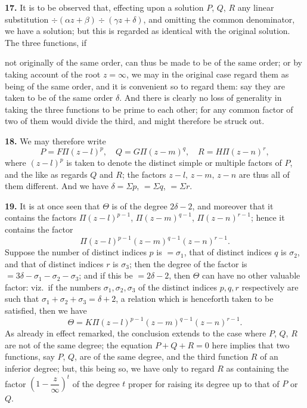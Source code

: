 \documentclass[11pt]{article}
\newcommand{\artno}[1]{\textbf{#1.}\quad}
\begin{document}
\artno{17} It is to be observed that, effecting upon a solution $P$, $Q$, $R$ any linear substitution
$\div (\alpha z + \beta) \div (\gamma z + \delta)$, and omitting the common denominator, we have a solution;
but this is regarded as identical with the original solution. The three functions, if

\newpage
not originally of the same order, can thus be made to be of the same order; or by
taking account of the root $z = \infty$, we may in the original case regard them as being
of the same order, and it is convenient so to regard them: say they are taken to
be of the same order $\delta$. And there is clearly no loss of generality in taking the
three functions to be prime to each other; for any common factor of two of them
would divide the third, and might therefore be struck out.

\artno{18} We may therefore write
\[
   P = F\Pi(z-l)^{p}, \quad Q = G\Pi(z-m)^{q}, \quad R = H\Pi(z-n)^{r},
\]
where $(z-l)^{p}$ is taken to denote the distinct simple or multiple factors of $P$, and
the like as regards $Q$ and $R$; the factors $z-l,\,z-m,\,z-n$ are thus all of them different.
And we have $\delta = \Sigma p$, $= \Sigma q$, $= \Sigma r$.

\artno{19} It is at once seen that $\Theta$ is of the degree $2\delta - 2$, and moreover that it
contains the factors $\Pi(z-l)^{p-1}$, $\Pi(z-m)^{q-1}$, $\Pi(z-n)^{r-1}$; hence it contains the factor
\[
   \Pi(z-l)^{p-1}(z-m)^{q-1}(z-n)^{r-1}.
\]
Suppose the number of distinct indices $p$ is $=\sigma_{1}$, that of distinct indices $q$ is $\sigma_{2}$, and
that of distinct indices $r$ is $\sigma_{3}$; then the degree of the factor is $=3\delta - \sigma_{1} - \sigma_{2} - \sigma_{3}$;
and if this be $=2\delta - 2$, then $\Theta$ can have no other valuable factor: viz.\ if the numbers
$\sigma_{1}, \sigma_{2}, \sigma_{3}$ of the distinct indices $p, q, r$ respectively are such that $\sigma_{1} + \sigma_{2} + \sigma_{3} = \delta + 2$,
a relation which is henceforth taken to be satisfied, then we have
\[
   \Theta = K\Pi(z-l)^{p-1}(z-m)^{q-1}(z-n)^{r-1}.
\]
As already in effect remarked, the conclusion extends to the case where $P$, $Q$, $R$ are
not of the same degree; the equation $P + Q + R = 0$ here implies that two functions,
say $P$, $Q$, are of the same degree, and the third function $R$ of an inferior degree;
but, this being so, we have only to regard $R$ as containing the factor $\left(1 - \dfrac{z}{\infty}\right)^{\!t}$ of
the degree $t$ proper for raising its degree up to that of $P$ or $Q$.
\end{document}
